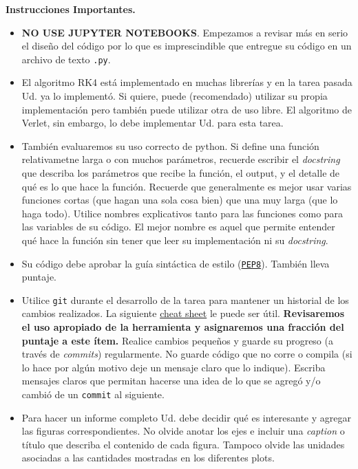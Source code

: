 \documentclass[letter, 11pt]{article}
\begin{document}
\pagebreak
\noindent\textbf{Instrucciones Importantes.}
\begin{itemize}

\item \textbf{NO USE JUPYTER NOTEBOOKS}. Empezamos a revisar más en serio el
  diseño del código por lo que es imprescindible que entregue su código en un
  archivo de texto \texttt{.py}.

\item El algoritmo RK4 está implementado en muchas librerías y en la tarea
  pasada Ud. ya lo implementó. Si quiere, puede (recomendado) utilizar su
  propia implementación pero también puede utilizar otra de uso libre. El
  algoritmo de Verlet, sin embargo, lo debe implementar Ud. para esta tarea.

\item También evaluaremos su uso correcto de python. Si define una función
  relativametne larga o con muchos parámetros, recuerde escribir el
  \emph{docstring} que describa los parámetros que recibe la función, el
  output, y el detalle de qué es lo que hace la función. Recuerde que
  generalmente es mejor usar varias funciones cortas (que hagan una sola cosa
  bien) que una muy larga (que lo haga todo).  Utilice nombres explicativos
  tanto para las funciones como para las variables de su código. El mejor
  nombre es aquel que permite entender qué hace la función sin tener que leer
  su implementación ni su \emph{docstring}.

\item Su código debe aprobar la guía sintáctica de estilo
  (\href{https://www.python.org/dev/peps/pep-0008/}{\texttt{PEP8}}). También
  lleva puntaje.

\item Utilice \texttt{git} durante el desarrollo de la tarea para mantener un
  historial de los cambios realizados. La siguiente
  \href{https://education.github.com/git-cheat-sheet-education.pdf}{cheat
    sheet} le puede ser útil. {\bf Revisaremos el uso apropiado de la
  herramienta y asignaremos una fracción del puntaje a este ítem.} Realice
  cambios pequeños y guarde su progreso (a través de \emph{commits})
  regularmente. No guarde código que no corre o compila (si lo hace por algún
  motivo deje un mensaje claro que lo indique). Escriba mensajes claros que
  permitan hacerse una idea de lo que se agregó y/o cambió de un
  \texttt{commit} al siguiente.

\item Para hacer un informe completo Ud. debe decidir qué es interesante y
  agregar las figuras correspondientes. No olvide anotar los ejes e incluir una
  \emph{caption} o título que describa el contenido de cada figura. Tampoco
  olvide las unidades asociadas a las cantidades mostradas en los diferentes
  plots.


\end{itemize}
\end{document}
